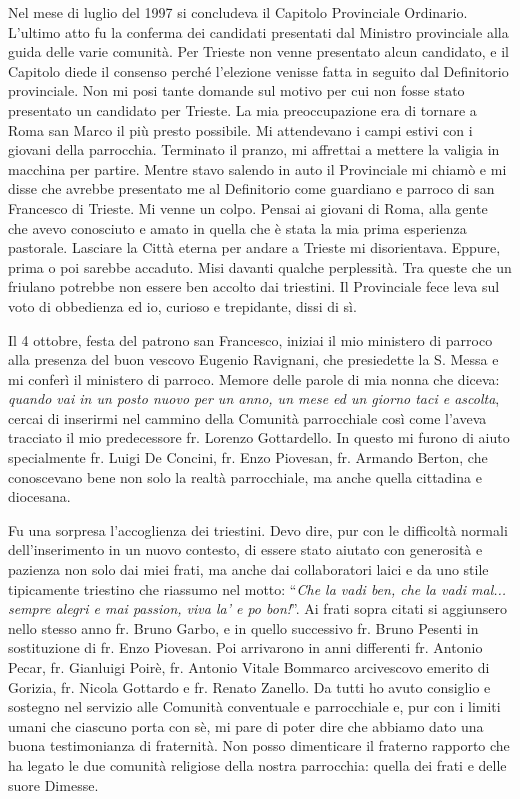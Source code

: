 Nel mese di luglio del 1997 si concludeva il Capitolo Provinciale Ordinario. L’ultimo atto fu la 
conferma dei candidati presentati dal Ministro provinciale alla guida delle varie comunità. Per 
Trieste non venne presentato alcun candidato, e il Capitolo diede il consenso perché l’elezione 
venisse fatta in seguito dal Definitorio provinciale. Non mi posi tante domande sul motivo per 
cui non fosse stato presentato un candidato per Trieste. La mia preoccupazione era di tornare a 
Roma san Marco il più presto possibile. Mi attendevano i campi estivi con i giovani della 
parrocchia. Terminato il pranzo, mi affrettai a mettere la valigia in macchina per partire. Mentre 
stavo salendo in auto il Provinciale mi chiamò e mi disse che avrebbe presentato me al 
Definitorio come guardiano e parroco di san Francesco di Trieste. Mi venne un colpo. Pensai ai 
giovani di Roma, alla gente che avevo conosciuto e amato in quella che è stata la mia prima 
esperienza pastorale. Lasciare la Città eterna per andare a Trieste mi disorientava. Eppure, prima 
o poi sarebbe accaduto. Misi davanti qualche perplessità. Tra queste che un friulano potrebbe 
non essere ben accolto dai triestini. Il Provinciale fece leva sul voto di obbedienza ed io, curioso 
e trepidante, dissi di sì.

Il 4 ottobre, festa del patrono san Francesco, iniziai il mio ministero di parroco alla presenza del 
buon vescovo Eugenio Ravignani, che presiedette la S. Messa e mi conferì il ministero di 
parroco.
\medbreak
Memore delle parole di mia nonna che diceva: \textit{quando vai in un posto nuovo per un anno, un
mese ed un giorno taci e ascolta}, cercai di inserirmi nel cammino della Comunità parrocchiale
così come l’aveva tracciato il mio predecessore fr. Lorenzo Gottardello. In questo mi furono di 
aiuto specialmente fr. Luigi De Concini, fr. Enzo Piovesan, fr. Armando Berton, che 
conoscevano bene non solo la realtà parrocchiale, ma anche quella cittadina e diocesana.

Fu una sorpresa l’accoglienza dei triestini. Devo dire, pur con le difficoltà normali 
dell’inserimento in un nuovo contesto, di essere stato aiutato con generosità e pazienza non solo 
dai miei frati, ma anche dai collaboratori laici e da uno stile tipicamente triestino che riassumo 
nel motto: \enquote{\textit{Che la vadi ben, che la vadi mal... sempre alegri e mai passion, viva la' e po bon!}}.
Ai frati sopra citati si aggiunsero nello stesso anno fr. Bruno Garbo, e in quello successivo fr. 
Bruno Pesenti in sostituzione di fr. Enzo Piovesan. Poi arrivarono in anni differenti fr. Antonio 
Pecar, fr. Gianluigi Poirè, fr. Antonio Vitale Bommarco arcivescovo emerito di Gorizia, fr. 
Nicola Gottardo e fr. Renato Zanello. Da tutti ho avuto consiglio e sostegno nel servizio alle 
Comunità conventuale e parrocchiale e, pur con i limiti umani che ciascuno porta con sè, mi pare 
di poter dire che abbiamo dato una buona testimonianza di fraternità.
\medbreak
Non posso dimenticare il fraterno rapporto che ha legato le due comunità religiose della nostra 
parrocchia: quella dei frati e delle suore Dimesse.

